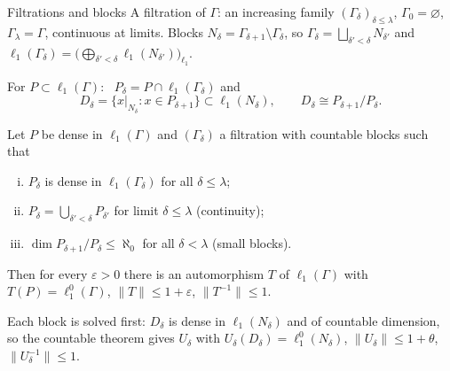 \documentclass[10pt,aspectratio=169]{beamer}
\newcommand{\lo}[1]{\ell_1^0(#1)}
\newcommand{\ellone}[1]{\ell_1(#1)}
\begin{document}
\begin{frame}{Filtrations and blocks}
  A \alert{filtration} of $\Gamma$: an increasing family ${(\Gamma_\delta)}_{\delta\le\lambda}$,
  $\Gamma_0=\varnothing$, $\Gamma_\lambda=\Gamma$, continuous at limits.
  Blocks $N_\delta=\Gamma_{\delta+1}\setminus\Gamma_\delta$, so
  $\Gamma_\delta=\bigsqcup_{\delta'<\delta}N_{\delta'}$ and
  $\ellone{\Gamma_\delta}=\bigl(\bigoplus_{\delta'<\delta}\ellone{N_{\delta'}}\bigr)_{\ell_1}$.
  \medskip

  For $P\subset\ellone\Gamma$: \ $P_\delta=P\cap\ellone{\Gamma_\delta}$ and
  \[
    D_\delta=\{x|_{N_\delta}:x\in P_{\delta+1}\}\subset\ellone{N_\delta},
    \qquad D_\delta\cong P_{\delta+1}/P_\delta .
  \]
  \begin{theorem}
    Let $P$ be dense in $\ellone\Gamma$ and ${(\Gamma_\delta)}$ a filtration with
    countable blocks such that
    \begin{enumerate}[(i)]
      \item $P_\delta$ is dense in $\ellone{\Gamma_\delta}$ for all $\delta\le\lambda$;
      \item $P_\delta=\bigcup_{\delta'<\delta}P_{\delta'}$ for limit $\delta\le\lambda$ \hfill (continuity);
      \item $\dim P_{\delta+1}/P_\delta\le\aleph_0$ for all $\delta<\lambda$ \hfill (small blocks).
    \end{enumerate}
    Then for every $\varepsilon>0$ there is an automorphism $T$ of $\ellone\Gamma$
    with $T(P)=\lo\Gamma$, $\|T\|\le1+\varepsilon$, $\|T^{-1}\|\le1$.
  \end{theorem}
  Each block is solved first: $D_\delta$ is dense in $\ellone{N_\delta}$ and of
  countable dimension, so the countable theorem gives $U_\delta$ with
  $U_\delta(D_\delta)=\lo{N_\delta}$, $\|U_\delta\|\le1+\theta$, $\|U_\delta^{-1}\|\le1$.
\end{frame}
\end{document}
